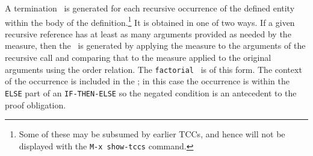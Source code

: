 A termination \tcc\ is generated for each recursive occurrence of the
defined entity within the body of the definition.\footnote{Some of these
may be subsumed by earlier TCCs, and hence will not be displayed with the
\texttt{M-x show-tccs} command.}  It is obtained in one of two ways.  If a
given recursive reference has at least as many arguments provided as
needed by the measure, then the \tcc\ is generated by applying the measure
to the arguments of the recursive call and comparing that to the measure
applied to the original arguments using the order relation.  The
\texttt{factorial} \tcc\ is of this form.  The context of the occurrence
is included in the \tcc; in this case the occurrence is within the
\texttt{ELSE} part of an \texttt{IF-THEN-ELSE} so the negated condition is
an antecedent to the proof obligation.

